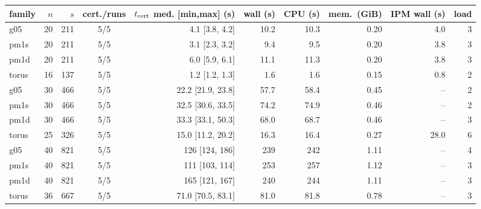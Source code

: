 \begin{tabular}{l r r c r r r r r r}\toprule
family & $n$ & $s$ & cert./runs & $t_{\rm cert}$ med. [min,max] (s) & wall (s) & CPU (s) & mem.\ (GiB) & IPM wall (s) & load \\\midrule
g05 & 20 & 211 & 5/5 & 4.1 [3.8, 4.2] & 10.2 & 10.3 & 0.20 & 4.0 & 3 \\
pm1s & 20 & 211 & 5/5 & 3.1 [2.3, 3.2] & 9.4 & 9.5 & 0.20 & 3.8 & 3 \\
pm1d & 20 & 211 & 5/5 & 6.0 [5.9, 6.1] & 11.1 & 11.3 & 0.20 & 3.8 & 3 \\
torus & 16 & 137 & 5/5 & 1.2 [1.2, 1.3] & 1.6 & 1.6 & 0.15 & 0.8 & 2 \\
g05 & 30 & 466 & 5/5 & 22.2 [21.9, 23.8] & 57.7 & 58.4 & 0.45 & -- & 2 \\
pm1s & 30 & 466 & 5/5 & 32.5 [30.6, 33.5] & 74.2 & 74.9 & 0.46 & -- & 2 \\
pm1d & 30 & 466 & 5/5 & 33.3 [33.1, 50.3] & 68.0 & 68.7 & 0.46 & -- & 3 \\
torus & 25 & 326 & 5/5 & 15.0 [11.2, 20.2] & 16.3 & 16.4 & 0.27 & 28.0 & 6 \\
g05 & 40 & 821 & 5/5 & 126 [124, 186] & 239 & 242 & 1.11 & -- & 4 \\
pm1s & 40 & 821 & 5/5 & 111 [103, 114] & 253 & 257 & 1.12 & -- & 3 \\
pm1d & 40 & 821 & 5/5 & 165 [121, 167] & 240 & 244 & 1.11 & -- & 3 \\
torus & 36 & 667 & 5/5 & 71.0 [70.5, 83.1] & 81.0 & 81.8 & 0.78 & -- & 3 \\
\bottomrule\end{tabular}
